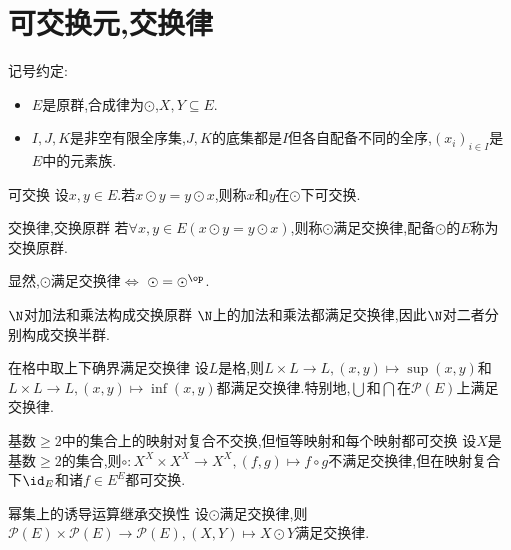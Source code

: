 \section{可交换元,交换律}

记号约定:
\begin{itemize}
	\item $E$是原群,合成律为$\odot$,$X,Y\subseteq E$.
	\item $I,J,K$是非空有限全序集,$J,K$的底集都是$I$但各自配备不同的全序,$\left(x_{i}\right)_{i\in I}$是$E$中的元素族.
\end{itemize}

\begin{definition}{可交换}{}
	设$x,y\in E$.若$x\odot y=y\odot x$,则称$x$和$y$在$\odot$下可交换.
\end{definition}

\begin{definition}{交换律,交换原群}{}
	若$\forall x,y\in E\left(x\odot y=y\odot x\right)$,则称$\odot$满足交换律,配备$\odot$的$E$称为交换原群.
\end{definition}

显然,$\odot$满足交换律$\iff$ $\odot=\odot^{\op}$.

\begin{example}{$\N$对加法和乘法构成交换原群}{}
	$\N$上的加法和乘法都满足交换律,因此$\N$对二者分别构成交换半群.
\end{example}

\begin{example}{在格中取上下确界满足交换律}{}
	设$L$是格,则$L\times L\to L,\left(x,y\right)\mapsto\sup\left(x,y\right)$和$L\times L\to L,\left(x,y\right)\mapsto\inf\left(x,y\right)$都满足交换律.特别地,$\bigcup$和$\bigcap$在$\mathcal{P}\left(E\right)$上满足交换律.
\end{example}

\begin{example}{基数$\geq 2$中的集合上的映射对复合不交换,但恒等映射和每个映射都可交换}{}
	设$X$是基数$\geq 2$的集合,则$\circ:X^{X}\times X^{X}\to X^{X},\left(f,g\right)\mapsto f\circ g$不满足交换律,但在映射复合下$\id_{E}$和诸$f\in E^{E}$都可交换.
\end{example}

\begin{example}{幂集上的诱导运算继承交换性}{}
	设$\odot$满足交换律,则$\mathcal{P}\left(E\right)\times\mathcal{P}\left(E\right)\to\mathcal{P}\left(E\right),\left(X,Y\right)\mapsto X\odot Y$满足交换律.
\end{example}

